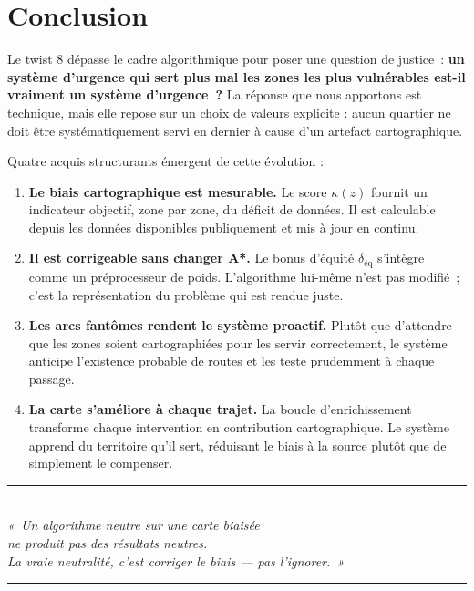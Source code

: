 \documentclass[12pt,a4paper]{article}
\theoremstyle{definition}
\theoremstyle{remark}
\begin{document}
\newpage

\section*{Conclusion}

Le twist 8 dépasse le cadre algorithmique pour poser une question
de justice~: \textbf{un système d'urgence qui sert plus mal
les zones les plus vulnérables est-il vraiment un système d'urgence~?}
La réponse que nous apportons est technique, mais elle repose sur
un choix de valeurs explicite : aucun quartier ne doit être
systématiquement servi en dernier à cause d'un artefact cartographique.

\medskip
Quatre acquis structurants émergent de cette évolution :

\begin{enumerate}[leftmargin=2em, itemsep=4pt]
  \item \textbf{Le biais cartographique est mesurable.}
    Le score $\kappa(z)$ fournit un indicateur objectif, zone par zone,
    du déficit de données. Il est calculable depuis les données
    disponibles publiquement et mis à jour en continu.

  \item \textbf{Il est corrigeable sans changer A*.}
    Le bonus d'équité $\delta_\text{éq}$ s'intègre comme un
    préprocesseur de poids. L'algorithme lui-même n'est pas modifié~;
    c'est la représentation du problème qui est rendue juste.

  \item \textbf{Les arcs fantômes rendent le système proactif.}
    Plutôt que d'attendre que les zones soient cartographiées pour
    les servir correctement, le système anticipe l'existence probable
    de routes et les teste prudemment à chaque passage.

  \item \textbf{La carte s'améliore à chaque trajet.}
    La boucle d'enrichissement transforme chaque intervention en
    contribution cartographique. Le système apprend du territoire
    qu'il sert, réduisant le biais à la source plutôt que de
    simplement le compenser.
\end{enumerate}

\medskip
\begin{center}
  {\color{twist}\rule{0.5\linewidth}{1pt}}\\[0.5em]
  {\itshape «~Un algorithme neutre sur une carte biaisée\\
  ne produit pas des résultats neutres.\\
  La vraie neutralité, c'est corriger le biais --- pas l'ignorer.~»}\\[0.5em]
  {\color{twist}\rule{0.5\linewidth}{1pt}}
\end{center}
\end{document}
